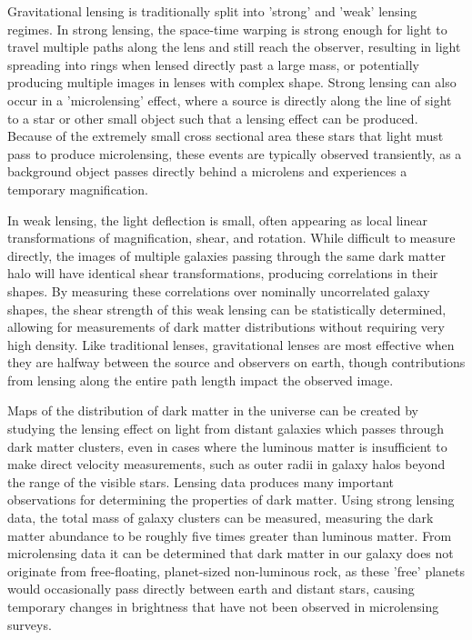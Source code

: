 Gravitational lensing is traditionally split into 'strong' and 'weak' lensing regimes. 
In strong lensing, the space-time warping is strong enough for light to travel multiple paths along the lens and still reach the observer, resulting in light spreading into rings when lensed directly past a large mass, or potentially producing multiple images in lenses with complex shape.
Strong lensing can also occur in a 'microlensing' effect, where a source is directly along the line of sight to a star or other small object such that a lensing effect can be produced.
Because of the extremely small cross sectional area these stars that light must pass to produce microlensing, these events are typically observed transiently, as a background object passes directly behind a microlens and experiences a temporary magnification. 

In weak lensing, the light deflection is small, often appearing as local linear transformations of magnification, shear, and rotation. 
While difficult to measure directly, the images of multiple galaxies passing through the same dark matter halo will have identical shear transformations, producing correlations in their shapes.
By measuring these correlations over nominally uncorrelated galaxy shapes, the shear strength of this weak lensing can be statistically determined, allowing for measurements of dark matter distributions without requiring very high density.
Like traditional lenses, gravitational lenses are most effective when they are halfway between the source and observers on earth, though contributions from lensing along the entire path length impact the observed image.

Maps of the distribution of dark matter in the universe can be created by studying the lensing effect on light from distant galaxies which passes through dark matter clusters, even in cases where the luminous matter is insufficient to make direct velocity measurements, such as outer radii in galaxy halos beyond the range of the visible stars.
Lensing data produces many important observations for determining the properties of dark matter.
Using strong lensing data, the total mass of galaxy clusters can be measured, measuring the dark matter abundance to be roughly five times greater than luminous matter.
From microlensing data it can be determined that dark matter in our galaxy does not originate from free-floating, planet-sized non-luminous rock, as these 'free' planets would occasionally pass directly between earth and distant stars, causing temporary changes in brightness that have not been observed in microlensing surveys.


